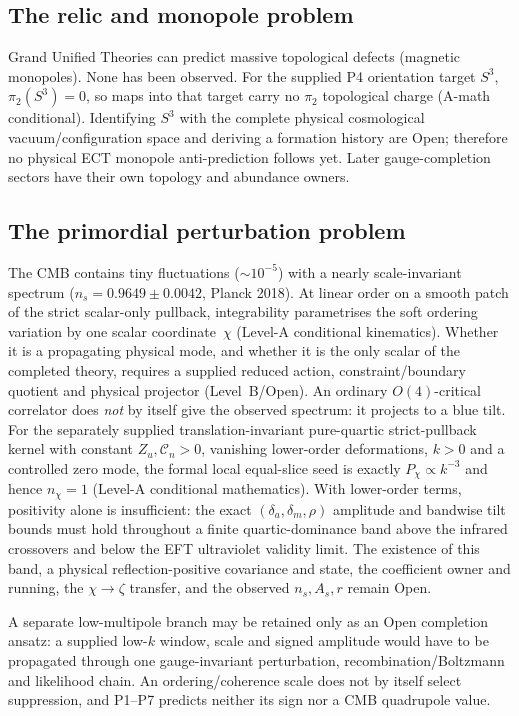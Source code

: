 \documentclass[11pt,a4paper]{article}
\begin{document}
\subsection{The relic and monopole problem}

Grand Unified Theories can predict massive topological defects (magnetic monopoles). None has been observed.  For the supplied P4 orientation target $S^3$, $\pi_2(S^3)=0$, so maps into that target carry no $\pi_2$ topological charge (A-math conditional).  Identifying $S^3$ with the complete physical cosmological vacuum/configuration space and deriving a formation history are Open; therefore no physical ECT monopole anti-prediction follows yet.  Later gauge-completion sectors have their own topology and abundance owners.

\subsection{The primordial perturbation problem}

The CMB contains tiny fluctuations ($\sim 10^{-5}$) with a nearly
scale-invariant spectrum ($n_s = 0.9649 \pm 0.0042$, Planck 2018).  At linear
order on a smooth patch of the strict scalar-only pullback, integrability
parametrises the soft ordering variation by one scalar coordinate~$\chi$
(Level-A conditional kinematics).  Whether it is a propagating physical mode,
and whether it is the only scalar of the completed theory, requires a supplied
reduced action, constraint/boundary quotient and physical projector
(Level~B/Open).  An ordinary $O(4)$-critical correlator does \emph{not} by
itself give the observed spectrum: it projects to a blue tilt.  For the
separately supplied translation-invariant pure-quartic strict-pullback kernel
with constant $Z_u,\mathcal C_n>0$, vanishing lower-order deformations,
$k>0$ and a controlled zero mode, the formal local equal-slice seed is exactly
$P_\chi\propto k^{-3}$ and hence $n_\chi=1$ (Level-A conditional
mathematics).  With lower-order terms, positivity alone is insufficient: the
exact $(\delta_a,\delta_m,\rho)$ amplitude and bandwise tilt bounds must hold
throughout a finite quartic-dominance band above the infrared crossovers and
below the EFT ultraviolet validity limit.  The existence of this band, a
physical reflection-positive covariance and state, the coefficient owner and
running, the $\chi\to\zeta$ transfer, and the observed $n_s,A_s,r$ remain
Open.

A separate low-multipole branch may be retained only as an Open completion
ansatz: a supplied low-$k$ window, scale and signed amplitude would have to be
propagated through one gauge-invariant perturbation, recombination/Boltzmann
and likelihood chain.  An ordering/coherence scale does not by itself select
suppression, and P1--P7 predicts neither its sign nor a CMB quadrupole value.
\end{document}
